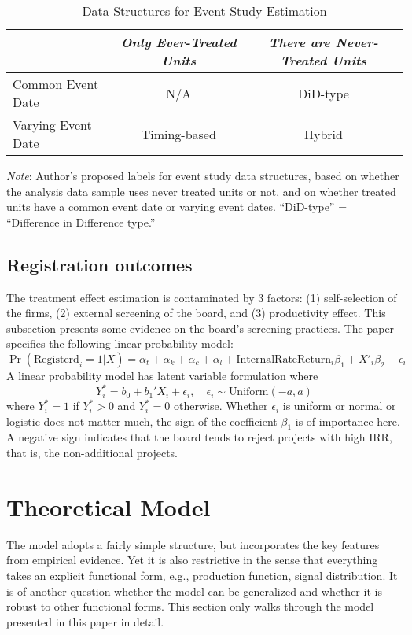\documentclass[12pt]{article}[margin=1in]
\begin{document}
\begin{table}[h]
    \centering
    \caption{Data Structures for Event Study Estimation}
    \begin{tabular}{lcc}
        \toprule
                           & \textit{Only Ever-Treated Units} & \textit{There are Never-Treated Units} \\
        \midrule
        Common Event Date  & N/A                              & DiD-type                               \\
        Varying Event Date & Timing-based                     & Hybrid                                 \\
        \bottomrule
    \end{tabular}
    \vspace{0.5em}
    \begin{minipage}{0.9\textwidth}
        \footnotesize
        \textit{Note}: Author’s proposed labels for event study data structures, based on whether the analysis data sample uses never treated units or not, and on whether treated units have a common event date or varying event dates. “DiD-type” = “Difference in Difference type.”
    \end{minipage}
\end{table}

\subsection{Registration outcomes}
The treatment effect estimation is contaminated by 3 factors: (1) self-selection of the firms, (2) external screening of the board, and (3) productivity effect. This subsection presents some evidence on the board's screening practices. The paper specifies the following linear probability model:
\begin{equation}
    \Pr(\text{Registerd}_i =1|X) = \alpha_t + \alpha_k + \alpha_{c} +  \alpha_{l} + \text{InternalRateReturn}_i\beta_1 + X'_i\beta_2 + \epsilon_i
\end{equation}
A linear probability model has latent variable formulation where
$$Y_i^* = b_0 + b_1'X_i + \epsilon_i, \quad \epsilon_i \sim \text{Uniform}(-a,a)$$
where $Y_i^* = 1$ if $Y_i^* > 0$ and $Y_i^* = 0$ otherwise.
Whether $\epsilon_i$ is uniform or normal or logistic does not matter much, the sign of the coefficient $\beta_1$ is of importance here. A negative sign indicates that the board tends to reject projects with high IRR, that is, the non-additional projects.

\section{Theoretical Model}
The model adopts a fairly simple structure, but incorporates the key features from empirical evidence. Yet it is also restrictive in the sense that everything takes an explicit functional form, e.g., production function, signal distribution. It is of another question whether the model can be generalized and whether it is robust to other functional forms. This section only walks through the model presented in this paper in detail.
\end{document}
